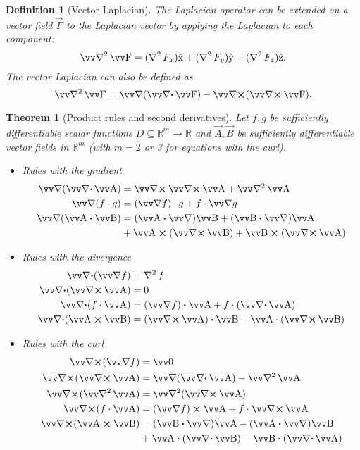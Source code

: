 \documentclass[margin=normal]{tex/hsrzf}
\theoremstyle{elmagzf}
\newtheorem{theorem}{Theorem}
\newtheorem{definition}{Definition}
\begin{document}
\begin{definition}[Vector Laplacian]
  The Laplacian operator can be extended on a vector field \(\vec{F}\) to the 
  \emph{Laplacian vector} by applying the Laplacian to each component:
  \[
    \vlaplacian \vec{F} 
      = (\laplacian F_x)\uvec{x} 
      + (\laplacian F_y)\uvec{y} 
      + (\laplacian F_z)\uvec{z} .
  \]
  The vector Laplacian can also be defined as
  \[
    \vlaplacian \vec{F} = \grad (\div \vec{F}) - \curl (\curl \vec{F}).
  \]
\end{definition}

\begin{theorem}[Product rules and second derivatives]
  Let \(f,g\) be sufficiently differentiable scalar functions \(D
  \subseteq\mathbb{R}^m \to \mathbb{R}\) and \(\vec{A}, \vec{B}\) be
  sufficiently differentiable vector fields in \(\mathbb{R}^m\) (with \(m = 2\)
  or 3 for equations with the curl).
  \begin{itemize}
    \item Rules with the gradient
      \begin{align*}
        \grad (\div \vec{A}) &= \curl \curl \vec{A} + \vlaplacian \vec{A} \\
        \grad (f\cdot g) &= (\grad f)\cdot g + f\cdot \grad g \\
        \grad (\vec{A} \dotp \vec{B}) &= 
          (\vec{A} \dotp \grad) \vec{B}
          + (\vec{B} \dotp \grad) \vec{A} \\
          & + \vec{A} \crossp (\curl \vec{B})
          + \vec{B} \crossp (\curl \vec{A})
      \end{align*}
    \item Rules with the divergence
      \begin{align*}
        \div (\grad f) &= \laplacian f \\
        \div (\curl \vec{A}) &= 0 \\
        \div (f\cdot \vec{A}) &= (\grad f) \dotp \vec{A} + f\cdot (\div \vec{A}) \\
        \div (\vec{A}\crossp\vec{B}) &= (\curl \vec{A})\dotp \vec{B} 
          - \vec{A} \cdot (\curl\vec{B})
      \end{align*}
    \item Rules with the curl
      \begin{align*}
        \curl (\grad f) &= \vec{0} \\
        \curl (\curl \vec{A}) &= \grad (\div \vec{A}) - \vlaplacian \vec{A} \\
        \curl (\vlaplacian \vec{A}) &= \vlaplacian (\curl \vec{A}) \\
        \curl (f\cdot \vec{A}) &= (\grad f)\crossp \vec{A} + f\cdot \curl \vec{A} \\
        \curl (\vec{A}\crossp\vec{B}) &= 
          (\vec{B} \dotp \grad) \vec{A} - (\vec{A} \dotp \grad) \vec{B} \\
          &+ \vec{A} \dotp (\div \vec{B}) - \vec{B} \dotp (\div \vec{A})
      \end{align*}
  \end{itemize}
\end{theorem}
\end{document}
